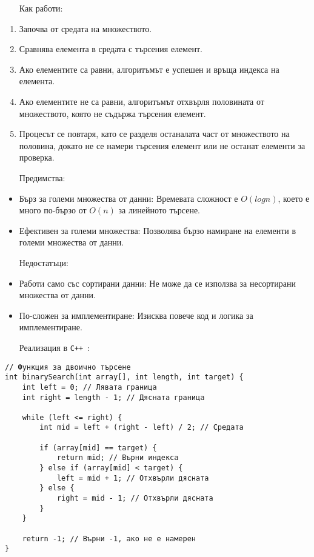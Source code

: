 \documentclass[oneside]{book}
\newcommand*{\cpp}{\texttt{C++}\ }
\begin{document}
\begin{enumerate}\item[Как работи:]\end{enumerate}
\begin{enumerate}
    \item Започва от средата на множеството.
    \item Сравнява елемента в средата с търсения елемент.
    \item Ако елементите са равни, алгоритъмът е успешен и връща индекса на елемента.
    \item Ако елементите не са равни, алгоритъмът отхвърля половината от множеството, която не съдържа търсения елемент.
    \item Процесът се повтаря, като се разделя останалата част от множеството на половина, докато не се намери търсения елемент или не останат елементи за проверка.
\end{enumerate}

\begin{itemize}\item[Предимства:]\end{itemize}
\begin{itemize}
    \item Бърз за големи множества от данни: Времевата сложност е $O(log n)$, което е много по-бързо от $O(n)$ за линейното търсене.
    \item Ефективен за големи множества: Позволява бързо намиране на елементи в големи множества от данни.
\end{itemize}

\begin{itemize}\item[Недостатъци:]\end{itemize}
\begin{itemize}
    \item Работи само със сортирани данни: Не може да се използва за несортирани множества от данни.
    \item По-сложен за имплементиране: Изисква повече код и логика за имплементиране.
\end{itemize}

\begin{itemize}\item[Реализация] в \cpp:\end{itemize}
\begin{mdframed}\begin{lstlisting}
// Функция за двоично търсене
int binarySearch(int array[], int length, int target) {
    int left = 0; // Лявата граница
    int right = length - 1; // Дясната граница

    while (left <= right) {
        int mid = left + (right - left) / 2; // Средата

        if (array[mid] == target) {
            return mid; // Върни индекса
        } else if (array[mid] < target) {
            left = mid + 1; // Отхвърли дясната
        } else {
            right = mid - 1; // Отхвърли дясната
        }
    }

    return -1; // Върни -1, ако не е намерен
}
\end{lstlisting}\end{mdframed}
\end{document}
